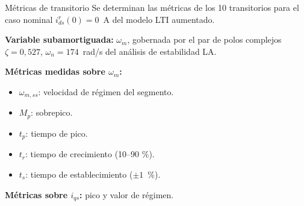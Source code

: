 \documentclass[aspectratio=169,t]{beamer}
\begin{document}
\begin{frame}{Métricas de transitorio}
{\small\color{uncGray}Se determinan las métricas de los 10 transitorios para el caso nominal $i_{ds}^{r}(0)=0$~A del modelo LTI aumentado.}\par
\vspace{4mm}

\textbf{Variable subamortiguada:} $\omega_m$, gobernada por el par de polos complejos $\zeta=0{,}527$, $\omega_n=174$~rad/s del análisis de estabilidad LA.

\textbf{Métricas medidas sobre $\omega_m$:}
\begin{itemize}
\item $\omega_{m,ss}$: velocidad de régimen del segmento.
\item $M_p$: sobrepico.
\item $t_p$: tiempo de pico.
\item $t_r$: tiempo de crecimiento (10--90 \%).
\item $t_s$: tiempo de establecimiento ($\pm 1$~\%).
\end{itemize}

\textbf{Métricas sobre $i_{qs}$:} pico y valor de régimen.

\end{frame}
\end{document}
